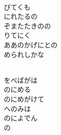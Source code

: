 \documentclass[10pt,b5j]{tarticle} %
\begin{document}
\begin{enumerate}
\begin{minipage}[c]{\blocksize}
        \vspace{\linespace}
        \item~\\
        びてくも\\
        にれたるの\\
        ぞまたたきのの\\
        りてにく\\
        ああのかげにとの\\
        められしかな
        
        \vspace{\linespace}
        \item~\\
        をべばがは\\
        のにめる\\
        のにめがけて\\
        へのみは\\
        のによでん\\
        の
    
    \end{minipage}
\end{enumerate} %
\end{document}
